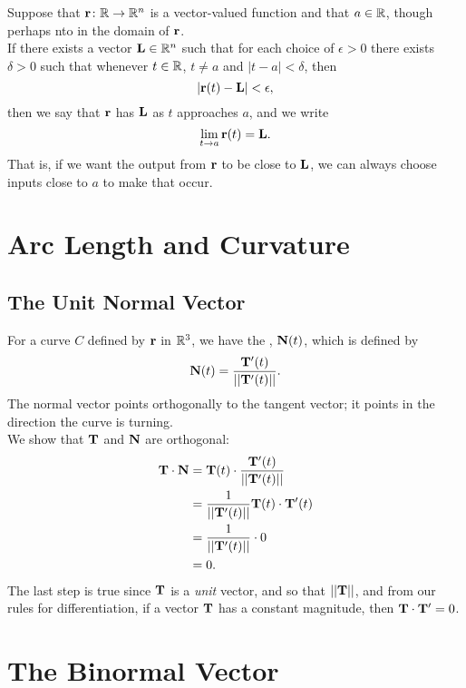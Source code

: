 Suppose that \(\mathbf{r} \colon \mathbb{R} \to \mathbb{R}^{n}\) is a vector-valued function and that \(a \in \mathbb{R}\), though perhaps nto in the domain of \(\mathbf{r}\). \\

If there exists a vector \(\mathbf{L} \in \mathbb{R}^{n}\) such that for each choice of \(\epsilon > 0\) there exists \(\delta >0\) such that whenever \(t \in \mathbb{R}\), \(t \ne a\) and \(|t - a| < \delta\), then 
\[
    |\mathbf{r}(t) - \mathbf{L}| < \epsilon,
\]
then we say that \(\mathbf{r}\) has  \(\mathbf{L}\) as \(t\) approaches \(a\), and we write
\[
    \lim_{t \to a} \mathbf{r}(t) = \mathbf{L}.
\]
That is, if we want the output from \(\mathbf{r}\) to be close to \(\mathbf{L}\), we can always choose inputs close to \(a\) to make that occur.


\newcommand{\vecfuc}[2]{\mb{#1}(#2)}
\newcommand{\dvecfuc}[2]{\mb{#1}'(#2)}
\newcommand{\normdvecfuc}[2]{||\mb{#1}'(#2)||}

\section{Arc Length and Curvature}

\subsection{The Unit Normal Vector}

For a curve \(C\) defined by \(\mathbf{r}\) in \(\mathbb{R}^{3}\), we have the , \(\mathbf{N}(t)\), which is defined by 
\[
    \vecfuc{N}{t} = \frac{\dvecfuc{T}{t}}{||\dvecfuc{T}{t}||}.
\]
The normal vector points orthogonally to the tangent vector; it points in the direction the curve is turning. \\

We show that \(\mathbf{T}\) and \(\mathbf{N}\) are orthogonal:
\begin{align*}
    \mb{T} \cdot \mb{N} &= \vecfuc{T}{t} \cdot \frac{\dvecfuc{T}{t}}{||\dvecfuc{T}{t}||} \\
    &= \frac{1}{\normdvecfuc{T}{t}} \vecfuc{T}{t} \cdot \dvecfuc{T}{t} \\
    &= \frac{1}{\normdvecfuc{T}{t}} \cdot 0 \\
    &= 0.
\end{align*}
The last step is true since \(\mathbf{T}\) is a \textit{unit} vector, and so that \(||\mathbf{T}||\), and from our rules for differentiation, if a vector \(\mathbf{T}\) has a constant magnitude, then \(\mathbf{T} \cdot \mathbf{T}' = 0\).

\section{The Binormal Vector}

